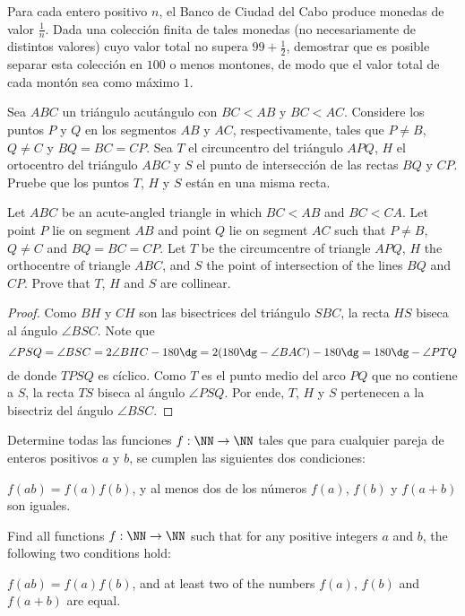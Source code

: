 \begin{problem}
  Para cada entero positivo $n$, el Banco de Ciudad del Cabo produce monedas de
  valor $\frac1n$. Dada una colección finita de tales monedas (no necesariamente
  de distintos valores) cuyo valor total no supera $99+\frac12$, demostrar que
  es posible separar esta colección en $100$ o menos montones, de modo que el
  valor total de cada montón sea como máximo $1$.
\end{problem}


\begin{probEG}[EGMO 2022/1]
  Sea $ABC$ un triángulo acutángulo con $BC<AB$ y $BC<AC$. Considere los puntos
  $P$ y $Q$ en los segmentos $AB$ y $AC$, respectivamente, tales que $P\ne B$,
  $Q\ne C$ y $BQ=BC=CP$. Sea $T$ el circuncentro del triángulo $APQ$, $H$ el
  ortocentro del triángulo $ABC$ y $S$ el punto de intersección de las rectas
  $BQ$ y $CP$. Pruebe que los puntos $T$, $H$ y $S$ están en una misma recta.
  \begin{hint}
    Let $ABC$ be an acute-angled triangle in which $BC<AB$ and $BC<CA$. Let
    point $P$ lie on segment $AB$ and point $Q$ lie on segment $AC$ such that
    $P\ne B$, $Q\ne C$ and $BQ=BC=CP$. Let $T$ be the circumcentre of triangle
    $APQ$, $H$ the orthocentre of triangle $ABC$, and $S$ the point of
    intersection of the lines $BQ$ and $CP$. Prove that $T$, $H$ and $S$ are
    collinear.
  \end{hint}
\end{probEG}

\begin{proof}
  Como $BH$ y $CH$ son las bisectrices del triángulo $SBC$, la recta $HS$ biseca
  al ángulo $\angle BSC$. Note que
  \[
    \angle PSQ
    =\angle BSC=2\angle BHC-180\dg
    =2(180\dg-\angle BAC)-180\dg
    =180\dg-\angle PTQ
  \]
  de donde $TPSQ$ es cíclico. Como $T$ es el punto medio del arco $PQ$ que no
  contiene a $S$, la recta $TS$ biseca al ángulo $\angle PSQ$. Por ende, $T$,
  $H$ y $S$ pertenecen a la bisectriz del ángulo $\angle BSC$.
\end{proof}

\begin{probMG}[EGMO 2022/2]
  Determine todas las funciones $f:\NN\to\NN$ tales que para cualquier pareja de
  enteros positivos $a$ y $b$, se cumplen las siguientes dos condiciones:
  \begin{enumerate}[(1)]
    \ii $f(ab)=f(a)f(b)$, y
    \ii al menos dos de los números $f(a)$, $f(b)$ y $f(a+b)$ son iguales.
  \end{enumerate}
  \begin{hint}
    Find all functions $f:\NN\to\NN$ such that for any positive integers $a$ and
    $b$, the following two conditions hold:
    \begin{enumerate}[(1)]
      \ii $f(ab)=f(a)f(b)$, and
      \ii at least two of the numbers $f(a)$, $f(b)$ and $f(a+b)$ are equal.
    \end{enumerate}
  \end{hint}
\end{probMG}

